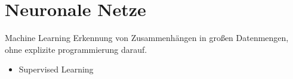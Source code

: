\section[\thesection \  Neuronale Netze]{Neuronale Netze}\label{sec:nn}

\begin{frame}{Machine Learning}
        Erkennung von Zusammenhängen in großen Datenmengen,\\ohne explizite programmierung darauf.
        \begin{itemize}
            \item Supervised Learning
        \end{itemize}

        \begin{figure}[h]
            \centering
            \def\svgwidth{0.8\columnwidth}
            
        \end{figure}

\end{frame}

